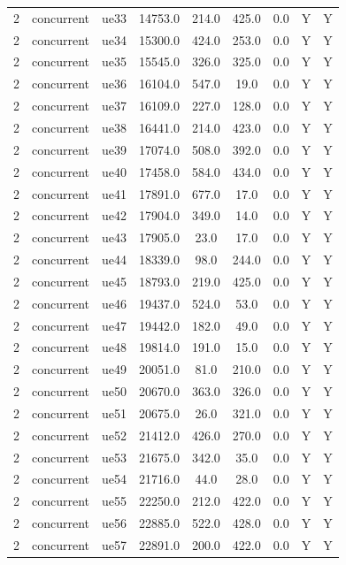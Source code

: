\begin{table}[ht]
\begin{tabular}{|c|c|c|c|c|c|c|c|c|}
2 & concurrent & ue33 & 14753.0 & 214.0 & 425.0 & 0.0 & Y & Y \\
2 & concurrent & ue34 & 15300.0 & 424.0 & 253.0 & 0.0 & Y & Y \\
2 & concurrent & ue35 & 15545.0 & 326.0 & 325.0 & 0.0 & Y & Y \\
2 & concurrent & ue36 & 16104.0 & 547.0 & 19.0 & 0.0 & Y & Y \\
2 & concurrent & ue37 & 16109.0 & 227.0 & 128.0 & 0.0 & Y & Y \\
2 & concurrent & ue38 & 16441.0 & 214.0 & 423.0 & 0.0 & Y & Y \\
2 & concurrent & ue39 & 17074.0 & 508.0 & 392.0 & 0.0 & Y & Y \\
2 & concurrent & ue40 & 17458.0 & 584.0 & 434.0 & 0.0 & Y & Y \\
2 & concurrent & ue41 & 17891.0 & 677.0 & 17.0 & 0.0 & Y & Y \\
2 & concurrent & ue42 & 17904.0 & 349.0 & 14.0 & 0.0 & Y & Y \\
2 & concurrent & ue43 & 17905.0 & 23.0 & 17.0 & 0.0 & Y & Y \\
2 & concurrent & ue44 & 18339.0 & 98.0 & 244.0 & 0.0 & Y & Y \\
2 & concurrent & ue45 & 18793.0 & 219.0 & 425.0 & 0.0 & Y & Y \\
2 & concurrent & ue46 & 19437.0 & 524.0 & 53.0 & 0.0 & Y & Y \\
2 & concurrent & ue47 & 19442.0 & 182.0 & 49.0 & 0.0 & Y & Y \\
2 & concurrent & ue48 & 19814.0 & 191.0 & 15.0 & 0.0 & Y & Y \\
2 & concurrent & ue49 & 20051.0 & 81.0 & 210.0 & 0.0 & Y & Y \\
2 & concurrent & ue50 & 20670.0 & 363.0 & 326.0 & 0.0 & Y & Y \\
2 & concurrent & ue51 & 20675.0 & 26.0 & 321.0 & 0.0 & Y & Y \\
2 & concurrent & ue52 & 21412.0 & 426.0 & 270.0 & 0.0 & Y & Y \\
2 & concurrent & ue53 & 21675.0 & 342.0 & 35.0 & 0.0 & Y & Y \\
2 & concurrent & ue54 & 21716.0 & 44.0 & 28.0 & 0.0 & Y & Y \\
2 & concurrent & ue55 & 22250.0 & 212.0 & 422.0 & 0.0 & Y & Y \\
2 & concurrent & ue56 & 22885.0 & 522.0 & 428.0 & 0.0 & Y & Y \\
2 & concurrent & ue57 & 22891.0 & 200.0 & 422.0 & 0.0 & Y & Y \\

\end{tabular}
\end{table}

